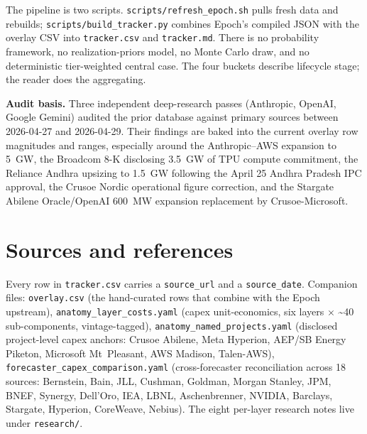 \documentclass[11pt]{article}
\begin{document}
The pipeline is two scripts. \texttt{scripts/refresh\_epoch.sh} pulls fresh data and rebuilds; \texttt{scripts/build\_tracker.py} combines Epoch's compiled JSON with the overlay CSV into \texttt{tracker.csv} and \texttt{tracker.md}. There is no probability framework, no realization-priors model, no Monte Carlo draw, and no deterministic tier-weighted central case. The four buckets describe lifecycle stage; the reader does the aggregating.

\textbf{Audit basis.} Three independent deep-research passes (Anthropic, OpenAI, Google Gemini) audited the prior database against primary sources between 2026-04-27 and 2026-04-29. Their findings are baked into the current overlay row magnitudes and ranges, especially around the Anthropic--AWS expansion to 5~GW, the Broadcom 8-K disclosing 3.5~GW of TPU compute commitment, the Reliance Andhra upsizing to 1.5~GW following the April 25 Andhra Pradesh IPC approval, the Crusoe Nordic operational figure correction, and the Stargate Abilene Oracle/OpenAI 600~MW expansion replacement by Crusoe-Microsoft.

\section*{Sources and references}
\noindent Every row in \texttt{tracker.csv} carries a \texttt{source\_url} and a \texttt{source\_date}. Companion files: \texttt{overlay.csv} (the hand-curated rows that combine with the Epoch upstream), \texttt{anatomy\_layer\_costs.yaml} (capex unit-economics, six layers $\times$ \textasciitilde40 sub-components, vintage-tagged), \texttt{anatomy\_named\_projects.yaml} (disclosed project-level capex anchors: Crusoe Abilene, Meta Hyperion, AEP/SB Energy Piketon, Microsoft Mt~Pleasant, AWS Madison, Talen-AWS), \texttt{forecaster\_capex\_comparison.yaml} (cross-forecaster reconciliation across 18 sources: Bernstein, Bain, JLL, Cushman, Goldman, Morgan Stanley, JPM, BNEF, Synergy, Dell'Oro, IEA, LBNL, Aschenbrenner, NVIDIA, Barclays, Stargate, Hyperion, CoreWeave, Nebius). The eight per-layer research notes live under \texttt{research/}.
\end{document}
